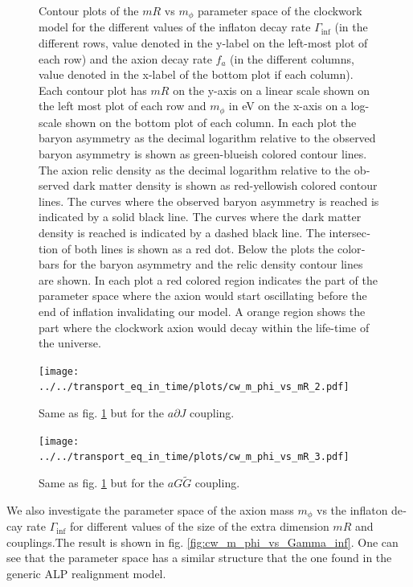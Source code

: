 \documentclass[master,       %
               twoside,        %
               BCOR10mm,       %
               english,ngerman, %
               ]{GAUBM}
\begin{document}
\begin{otherlanguage}{english}
\begin{figure}[H]
    \caption{Contour plots of the $mR$ vs $m_\phi$ parameter space of the clockwork model for the different values of the inflaton decay rate $\Gamma_\mathrm{inf}$ (in the different rows, value denoted in the y-label on the left-most plot of each row) and the axion decay rate $f_a$ (in the different columns, value denoted in the x-label of the bottom plot if each column). Each contour plot has $mR$ on the y-axis on a linear scale shown on the left most plot of each row and $m_\phi$ in eV on the x-axis on a log-scale shown on the bottom plot of each column. In each plot the baryon asymmetry as the decimal logarithm relative to the observed baryon asymmetry is shown as green-blueish colored contour lines. The axion relic density as the decimal logarithm relative to the observed dark matter density is shown as red-yellowish  colored contour lines. The curves where the observed baryon asymmetry is reached is indicated by a solid black line. The curves where the dark matter density is reached is indicated by a dashed black line. The intersection of both lines is shown as a red dot. Below the plots the colorbars for the baryon asymmetry and the relic density contour lines are shown. In each plot a red colored region indicates the part of the parameter space where the axion would start oscillating before the end of inflation invalidating our model. A orange region shows the part where the clockwork axion would decay within the life-time of the universe. }
    \label{fig:clockwork_parameter_space_aFF}
\end{figure}
\begin{figure}[H]
    \texttt{[image: ../../transport\_eq\_in\_time/plots/cw\_m\_phi\_vs\_mR\_2.pdf]}
    \caption{Same as fig. \ref{fig:clockwork_parameter_space_aFF} but for the $a \partial J$ coupling.}
     \label{fig:clockwork_parameter_space_aJ}
\end{figure}
\begin{figure}[H]
    \texttt{[image: ../../transport\_eq\_in\_time/plots/cw\_m\_phi\_vs\_mR\_3.pdf]}
    \caption{Same as fig. \ref{fig:clockwork_parameter_space_aFF} but for the $a G \tilde{G}$ coupling.}
    \label{fig:clockwork_parameter_space_aGG}
\end{figure}
We also investigate the parameter space of the axion mass $m_\phi$ vs the inflaton decay rate $\Gamma_\mathrm{inf}$
for different values of the size of the extra dimension $mR$ and couplings.The result is shown in fig. \ref{fig:cw_m_phi_vs_Gamma_inf}.
One can see that the parameter space has a similar structure that the one found in the generic ALP realignment model.

\end{otherlanguage}
\end{document}
